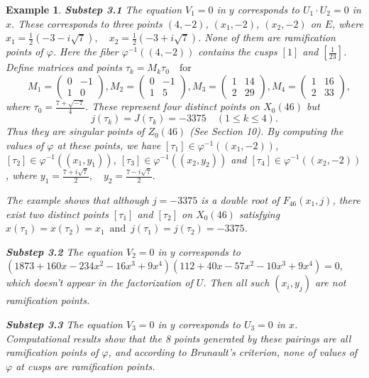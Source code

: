 \documentclass[10pt, a4paper]{article}
\newtheorem{example}[theorem]{Example}
\begin{document}
\begin{example}
{\bf Substep 3.1} The equation $V_1=0$  in $y$   corresponds to  $U_1 \cdot U_2 = 0$  in $x$.
These  corresponds to three points   $(4,-2)$, $(x_1,-2)$, $(x_2,-2)$  on $E$, where
$x_1 = \tfrac{1}{2}(-3 - i\sqrt{7}), \quad x_2 = \tfrac{1}{2}(-3 + i\sqrt{7})$.
None of  them  are ramification points of $\varphi$.  Here
the fiber $\varphi^{-1}((4,-2))$ contains the cusps $[1]$
and  $[\tfrac{1}{23}]$.
Define matrices and points $\tau_k = M_k \tau_0 \quad \text{for} $
\[
\quad M_1 = \begin{pmatrix} 0 & -1 \\ 1 & 0 \end{pmatrix}, M_2 = \begin{pmatrix} 0 & -1 \\ 1 & 5 \end{pmatrix},M_3 = \begin{pmatrix} 1 &14 \\ 2 & 29 \end{pmatrix}, M_4 = \begin{pmatrix} 1 & 16 \\ 2 & 33 \end{pmatrix},
\]
where $\tau_0 = \tfrac{7 + \sqrt{-7}}{4}$. These represent four distinct points on $X_0(46)$ but
\[
j(\tau_k) = J(\tau_k) = -3375 \quad (1 \leq k \leq 4).
\]
Thus they are singular points of $Z_0(46)$ (See Section 10). By computing the values of $\varphi$ at these points, we have
 $[\tau_1] \in \varphi^{-1}((x_1,-2))$,  $[\tau_2] \in \varphi^{-1}((x_1,y_1))$,  $[\tau_3] \in \varphi^{-1}((x_2,y_2))$ and  $[\tau_4] \in \varphi^{-1}((x_2,-2))$,
where $
y_1 = \frac{7 + i\sqrt{7}}{2}, \quad y_2 = \frac{7 - i\sqrt{7}}{2}.
$

The example shows that although $j = -3375$ is a double root of
$F_{46}(x_1,j)$,  there exist two distinct points $[\tau_1]$ and $[\tau_2]$ on
$X_0(46)$ satisfying  $x(\tau_1) = x(\tau_2) = x_1 \,\,\, \text{and} \,\,\,  j(\tau_1) = j(\tau_2) = -3375
$.

{\bf  Substep 3.2}
The equation $V_2=0$  in $y$   corresponds to
$(1873 + 160x - 234x^2 - 16x^3 + 9x^4)(112 + 40x - 57x^2 - 10x^3 + 9x^4) = 0,$
which doesn't  appear in the factorization of $U$. Then all such $(x_i,y_j)$ are not
ramification points.

{\bf  Substep 3.3}
The equation $V_3=0$  in $y$   corresponds to  $U_3 = 0$  in $x$.
 Computational results show
that the 8 points generated by these pairings are all ramification points of $\varphi$,
and  according to Brunault's criterion, none of  values of $\varphi$  at cusps are ramification points.
\end{example}
\end{document}
